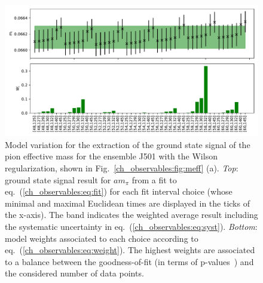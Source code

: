 \begin{figure}
\centering
	\includegraphics[width=1.\textwidth]{./cap3/figs/meff_ma_J501.pdf}
    \caption{Model variation for the extraction of the ground state signal of the pion effective mass for the ensemble J501 with the Wilson regularization, shown in Fig.~\ref{ch_observables:fig:meff} (a). {\it Top}: ground state signal result for $am_{\pi}$ from a fit to eq.~(\ref{ch_observables:eq:fit}) for each fit interval choice (whose minimal and maximal Euclidean times are displayed in the ticks of the x-axis). The band indicates the weighted average result including the systematic uncertainty in eq.~(\ref{ch_observables:eq:syst}). {\it Bottom}: model weights associated to each choice according to eq.~(\ref{ch_observables:eq:weight}). The highest weights are associated to a balance between the goodness-of-fit (in terms of p-values~\citep{Bruno:2022mfy}) and the considered number of data points.}
    \label{ch_observables:fig:model_av}
\end{figure}



